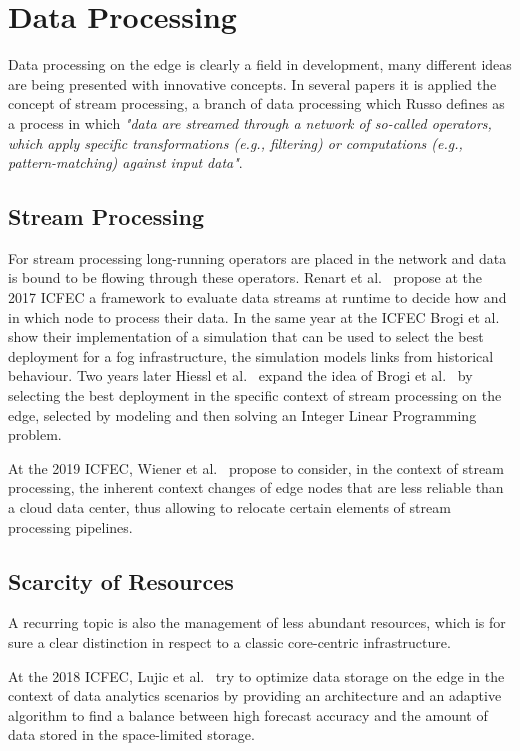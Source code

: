 \section{Data Processing}
Data processing on the edge is clearly a field in development, many different ideas are being presented with innovative concepts.
In several papers it is applied the concept of stream processing, a branch of data processing which Russo \cite{auto-scaling-streams} defines as a process in which \textit{"data are streamed through a network of so-called operators, which apply specific transformations (e.g., filtering) or computations (e.g., pattern-matching) against input data"}.


\subsection{Stream Processing}
For stream processing long-running operators are placed in the network and data is bound to be flowing through these operators. Renart et al.~\cite{data-driven-stream} propose at the 2017 ICFEC a framework to evaluate data streams at runtime to decide how and in which node to process their data.
In the same year at the ICFEC Brogi et al.~\cite{how-to-deploy-fog-applications} show their implementation of a simulation that can be used to select the best deployment for a fog infrastructure, the simulation models links from historical behaviour. Two years later Hiessl et al.~\cite{optimal-placement-stream} expand the idea of Brogi et al.~\cite{how-to-deploy-fog-applications} by selecting the best deployment in the specific context of stream processing on the edge, selected by modeling and then solving an Integer Linear Programming problem.

At the 2019 ICFEC, Wiener et al.~\cite{context-aware-stream-processing} propose to consider, in the context of stream processing, the inherent context changes of edge nodes that are less reliable than a cloud data center, thus allowing to relocate certain elements of stream processing pipelines.


\subsection{Scarcity of Resources}
A recurring topic is also the management of less abundant resources, which is for sure a clear distinction in respect to a classic core-centric infrastructure.

At the 2018 ICFEC, Lujic et al.~\cite{efficient-edge-storage} try to optimize data storage on the edge in the context of data analytics scenarios by providing an architecture and an adaptive algorithm to find a balance between high forecast accuracy and the amount of data stored in the space-limited storage.

